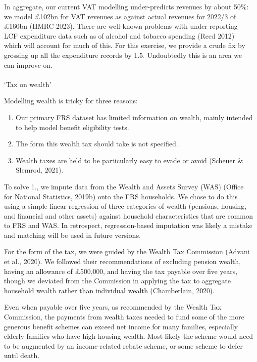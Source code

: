 \documentclass[
  letterpaper,
  DIV=11,
  numbers=noendperiod]{scrartcl}
\makeatletter
\let\oldparagraph\paragraph
\renewcommand{\paragraph}{
    \@ifstar
      \xxxParagraphStar
      \xxxParagraphNoStar
  }
\newcommand{\xxxParagraphStar}[1]{\oldparagraph*{#1}\mbox{}}
\newcommand{\xxxParagraphNoStar}[1]{\oldparagraph{#1}\mbox{}}
\providecommand{\tightlist}{%
  \setlength{\itemsep}{0pt}\setlength{\parskip}{0pt}}\usepackage{longtable,booktabs,array}
\makeatother
\begin{document}
In aggregate, our current VAT modelling under-predicts revenues by about
50\%: we model £102bn for VAT revenues as against actual revenues for
2022/3 of £160bn (HMRC 2023). There are well-known problems with
under-reporting LCF expenditure data such as of alcohol and tobacco
spending (Reed 2012) which will account for much of this. For this
exercise, we provide a crude fix by grossing up all the expenditure
records by 1.5. Undoubtedly this is an area we can improve on.

\paragraph{`Tax on wealth'}\label{tax-on-wealth}

Modelling wealth is tricky for three reasons:

\begin{enumerate}
\def\labelenumi{\arabic{enumi}.}
\tightlist
\item
  Our primary FRS dataset has limited information on wealth, mainly
  intended to help model benefit eligibility tests.
\item
  The form this wealth tax should take is not specified.
\item
  Wealth taxes are held to be particularly easy to evade or avoid
  (Scheuer \& Slemrod, 2021).
\end{enumerate}

To solve 1., we impute data from the Wealth and Assets Survey (WAS)
(Office for National Statistics, 2019b) onto the FRS households. We
chose to do this using a simple linear regression of three categories of
wealth (pensions, housing, and financial and other assets) against
household characteristics that are common to FRS and WAS. In retrospect,
regression-based imputation was likely a mistake and matching will be
used in future versions.

For the form of the tax, we were guided by the Wealth Tax Commission
(Advani et al., 2020). We followed their recommendations of excluding
pension wealth, having an allowance of £500,000, and having the tax
payable over five years, though we deviated from the Commission in
applying the tax to aggregate household wealth rather than individual
wealth (Chamberlain, 2020).

Even when payable over five years, as recommended by the Wealth Tax
Commission, the payments from wealth taxes needed to fund some of the
more generous benefit schemes can exceed net income for many families,
especially elderly families who have high housing wealth. Most likely
the scheme would need to be augmented by an income-related rebate
scheme, or some scheme to defer until death.
\end{document}
